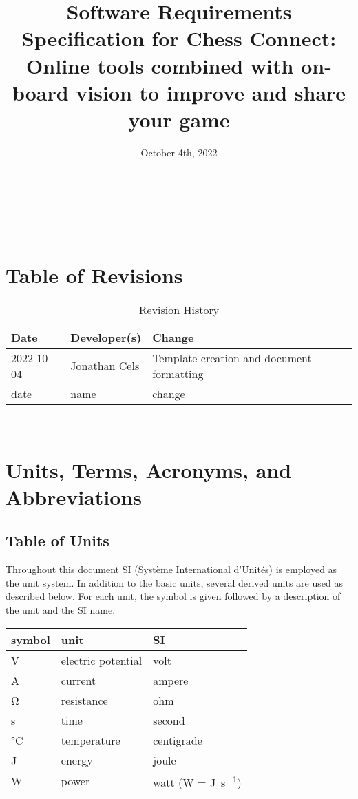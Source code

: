 \documentclass[12pt]{article}
\begin{document}
\title{Software Requirements Specification for Chess Connect: Online tools combined with on-board vision to improve and share your game} 
\author{\authname}
\date{October 4th, 2022}
	
\maketitle

~\newpage

\tableofcontents

~\newpage

\section*{Table of Revisions}
\begin{table}[hp]
\caption{Revision History} \label{TblRevisionHistory}
\begin{tabularx}{\textwidth}{llX}
\toprule
\textbf{Date} & \textbf{Developer(s)} & \textbf{Change}\\
\midrule
2022-10-04 & Jonathan Cels & Template creation and document formatting\\ 
date & name & change\\
\bottomrule
\end{tabularx}
\end{table}

~\newpage

\section{Units, Terms, Acronyms, and Abbreviations}

\subsection{Table of Units}
Throughout this document SI (Syst\`{e}me International d'Unit\'{e}s) is employed
as the unit system.  In addition to the basic units, several derived units are
used as described below.  For each unit, the symbol is given followed by a
description of the unit and the SI name.

\begin{table}[ht]
  \noindent \begin{tabular}{l l l} 
    \toprule		
    \textbf{symbol} & \textbf{unit} & \textbf{SI}\\
    \midrule 
    \si{\volt} & electric potential & volt\\
    \si{\ampere} & current	& ampere\\
    \si{\ohm} & resistance	& ohm\\
    \si{\second} & time & second\\
    \si{\celsius} & temperature & centigrade\\
    \si{\joule} & energy & joule\\
    \si{\watt} & power & watt (W = \si{\joule\per\second})\\
    \bottomrule
  \end{tabular}
\end{table}
\end{document}
